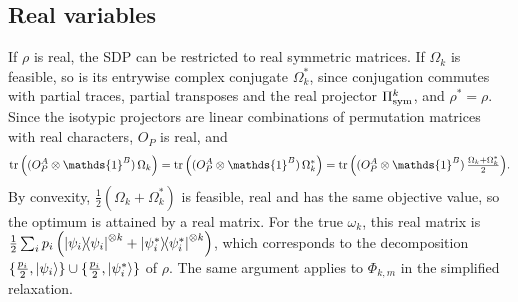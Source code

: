 \documentclass[aps,pra,twocolumn,showpacs,superscriptaddress,groupedaddress]{revtex4-2}
\newcommand{\one}[0]{\mathds{1}}
\newcommand{\I}{\one}
\begin{document}
\begin{widetext}
\subsection{Real variables}
If $\rho$ is real, the SDP can be restricted to real symmetric matrices. If $\Omega_k$ is feasible, so is its entrywise complex conjugate $\Omega_k^*$, since conjugation commutes with partial traces, partial transposes and the real projector $\Pi_{\rm sym}^k$, and $\rho^*=\rho$. Since the isotypic projectors are linear combinations of permutation matrices with real characters, $O_P$ is real, and
\begin{equation}
    \tr\left((O_P^A \otimes \I^B)\, \Omega_k\right) = \tr\left((O_P^A \otimes \I^B)\, \Omega_k^*\right) = \tr\Big((O_P^A \otimes \I^B)\, \tfrac{\Omega_k + \Omega_k^*}{2}\Big).
\end{equation}
By convexity, $\frac12(\Omega_k+\Omega_k^*)$ is feasible, real and has the same objective value, so the optimum is attained by a real matrix. For the true $\omega_k$, this real matrix is $\frac{1}{2}\sum_i p_i \left(\dyad{\psi_i}^{\otimes k} + \dyad{\psi_i^*}^{\otimes k}\right)$, which corresponds to the decomposition $\{\frac{p_i}{2},\ket{\psi_i}\}\cup\{\frac{p_i}{2},\ket{\psi_i^*}\}$ of $\rho$. The same argument applies to $\Phi_{k,m}$ in the simplified relaxation.


\end{widetext}
\end{document}
